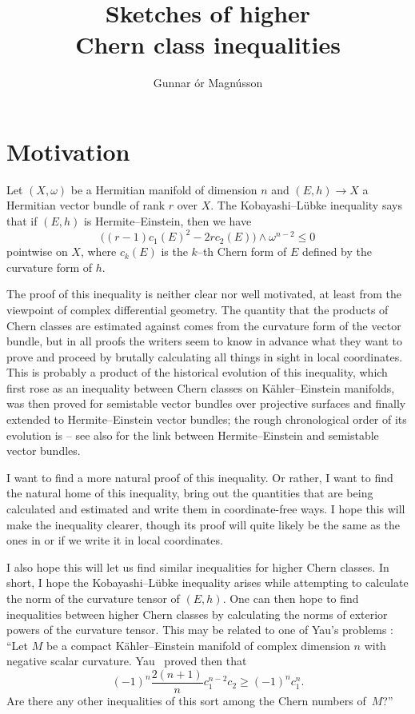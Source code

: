 \documentclass[11pt,a4paper]{amsart}
\author{Gunnar \TH\'or Magn\'usson}
\title{Sketches of higher\\ Chern class inequalities}
\theoremstyle{definition}
\theoremstyle{remark}
\numberwithin{equation}{section}
\begin{document}
\maketitle 



\section*{Motivation}

Let $(X,\omega)$ be a Hermitian manifold of dimension $n$ and $(E,h) \to X$
a Hermitian vector bundle of rank $r$ over $X$. The Kobayashi--L\"{u}bke
inequality says that if $(E,h)$ is Hermite--Einstein, then we have
$$
\bigl((r-1)c_1(E)^2 - 2rc_2(E)\bigr) \wedge \omega^{n-2} \leq 0
$$
pointwise on $X$, where $c_k(E)$ is the $k$--th Chern form of $E$ defined by the curvature form of $h$.

The proof of this inequality is neither clear nor well motivated, at
least from the viewpoint of complex differential geometry. The quantity
that the products of Chern classes are estimated against comes from the
curvature form of the vector bundle, but in all proofs the writers seem
to know in advance what they want to prove and proceed by brutally
calculating all things in sight in local coordinates. This is probably a
product of the historical evolution of this inequality, which first rose as
an inequality between Chern classes on K\"ahler--Einstein manifolds, was
then proved for semistable vector bundles over projective surfaces and
finally extended to Hermite--Einstein vector bundles; the rough
chronological order of its evolution is
\cite{Chen-Ogiue,Miyaoka,Bogomolov,Gieseker,Lubke} -- see also
\cite{Kobayashi,LubkeStab,Siu} for the link between Hermite--Einstein
and semistable vector bundles.

I want to find a more natural proof of this inequality. Or rather, I want
to find the natural home of this inequality, bring out the quantities
that are being calculated and estimated and write them in coordinate-free
ways. I hope this will make the inequality clearer, though its proof will
quite likely be the same as the ones in \cite{Chen-Ogiue} or \cite{Lubke}
if we write it in local coordinates.

I also hope this will let us find similar inequalities for higher Chern
classes. In short, I hope the Kobayashi--L\"{u}bke inequality arises while
attempting to calculate the norm of the curvature tensor of $(E,h)$. One can
then hope to find inequalities between higher Chern classes by calculating
the norms of exterior powers of the curvature tensor. This may be related
to one of Yau's problems \cite[Problem~45]{Yau}: ``Let $M$ be a compact
K\"{a}hler--Einstein manifold of complex dimension $n$ with negative scalar
curvature. Yau~\cite{Yau2} proved then that
$$
(-1)^n \frac{2(n+1)}{n} c_1^{n-2} c_2 \geq (-1)^n c_1^n.
$$
Are there any other inequalities of this sort among the Chern numbers
of~$M$?''%
\end{document}
